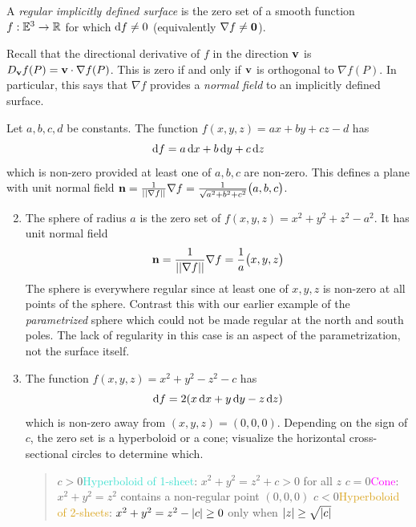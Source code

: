 

\begin{defn}{}{}
	A \emph{regular implicitly defined surface} is the zero set of a smooth function $f:\mathbb{E}^3\to\mathbb{R}$ for which ${\mathrm{d} f}\neq 0$ (equivalently $\nabla f\neq \mathbf{0}$).
\end{defn}

Recall that the directional derivative of $f$ in the direction ${\mathbf{v}}$ is $D_{{\mathbf{v}}}f(P)={\mathbf{v}}\cdot\nabla f(P)$. This is zero if and only if ${\mathbf{v}}$ is orthogonal to $\nabla f(P)$. In particular, this says that $\nabla f$ provides a \emph{normal field} to an implicitly defined surface.

\begin{examples}{}{}
	\exstart Let $a,b,c,d$ be constants. The function $f(x,y,z)=ax+by+cz-d$ has 
	\[
		{\mathrm{d} f}=a\,{\mathrm{d} x}+b\,{\mathrm{d} y}+c\,{\mathrm{d} z}
	\]
	which is non-zero provided at least one of $a,b,c$ are non-zero. This defines a plane with unit normal field ${\mathbf{n}}=\frac 1{\left| \left| \nabla f\right|\right|}\nabla f=\frac 1{\sqrt{a^2+b^2+c^2}}\bigl(a,b,c\bigr)$.
	\begin{enumerate}\setcounter{enumi}{1}
	  \item The sphere of radius $a$ is the zero set of $f(x,y,z)=x^2+y^2+z^2-a^2$. It has unit normal field
	  \[
	  	{\mathbf{n}}=\frac 1{\left| \left| \nabla f\right|\right|}\nabla f=\frac 1a\bigl(x,y,z\bigr)
	  \]
	The sphere is everywhere regular since at least one of $x,y,z$ is non-zero at all points of the sphere. Contrast this with our earlier example of the \emph{parametrized} sphere which could not be made regular at the north and south poles. The lack of regularity in this case is an aspect of the parametrization, not the surface itself.
		\item The function $f(x,y,z)=x^2+y^2-z^2-c$ has
		\[
			{\mathrm{d} f}=2(x\,{\mathrm{d} x}+y\,{\mathrm{d} y}-z\,{\mathrm{d} z})
		\]
		which is non-zero away from $(x,y,z)=(0,0,0)$. Depending on the sign of $c$, the zero set is a hyperboloid or a cone; visualize the horizontal cross-sectional circles to determine which.
		\begin{quote}
	  	$c>0$\quad \textcolor{Turquoise}{Hyperboloid of 1-sheet}: $x^2+y^2=z^2+c>0$ for all $z$\smallbreak
	  	$c=0$\quad \textcolor{Magenta}{Cone}: $x^2+y^2=z^2$ contains a non-regular point $(0,0,0)$\smallbreak
	  	$c<0$\quad \textcolor{Goldenrod}{Hyperboloid of 2-sheets}: $x^2+y^2=z^2-\left| c\right|\ge 0$ only when $\left| z\right|\ge \sqrt{\left| c\right|}$
		\end{quote}
		\begin{center}

\end{center}
\end{enumerate}
\end{examples}
